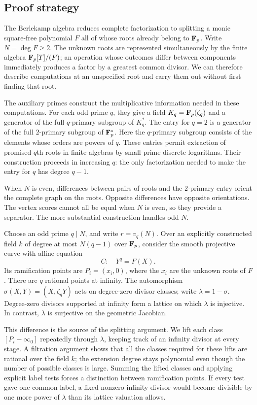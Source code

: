 \subsection{Proof strategy}

The Berlekamp algebra reduces complete factorization to splitting a monic
square-free polynomial $F$ all of whose roots already belong to $\mathbf F_p$.
Write $N=\deg F\ge2$. The unknown roots are represented simultaneously
by the finite algebra $\mathbf F_p[T]/(F)$; an operation whose outcomes differ
between components immediately produces a factor by a greatest common
divisor. We can therefore describe computations at an unspecified root
and carry them out without first finding that root.

The auxiliary primes construct the multiplicative information needed in
these computations. For each odd prime $q$, they give a field
$K_q=\mathbf F_p(\zeta_q)$ and a generator of the full $q$-primary subgroup of
$K_q^*$. The entry for $q=2$ is a generator of the full $2$-primary
subgroup of $\mathbf F_p^*$. Here the $q$-primary subgroup consists of the
elements whose orders are powers of $q$. These entries permit extraction
of promised $q$th roots in finite algebras by small-prime discrete
logarithms. Their construction proceeds in increasing $q$: the only
factorization needed to make the entry for $q$ has degree $q-1$.

When $N$ is even, differences between pairs of roots and the $2$-primary
entry orient the complete graph on the roots. Opposite differences have
opposite orientations. The vertex scores cannot all be equal when $N$
is even, so they provide a separator. The more substantial construction
handles odd $N$.

Choose an odd prime $q\mid N$, and write $r=v_q(N)$. Over an explicitly
constructed field $k$ of degree at most $N(q-1)$ over $\mathbf F_p$, consider
the smooth projective curve with affine equation
\[
 C:\quad Y^q=F(X).
\]
Its ramification points are $P_i=(x_i,0)$, where the $x_i$ are the
unknown roots of $F$. There are $q$ rational points at infinity.
The automorphism $\sigma(X,Y)=(X,\zeta_qY)$ acts on degree-zero divisor
classes; write $\lambda=1-\sigma$. Degree-zero divisors supported at
infinity form a lattice on which $\lambda$ is injective. In contrast,
$\lambda$ is surjective on the geometric Jacobian.

This difference is the source of the splitting argument. We lift each
class $[P_i-\infty_0]$ repeatedly through $\lambda$, keeping track of
an infinity divisor at every stage. A filtration argument shows that all
the classes required for these lifts are rational over the field $k$;
the extension degree stays polynomial even though the number of possible
classes is large. Summing the lifted classes and applying explicit label
tests forces a distinction between ramification points. If every test
gave one common label, a fixed nonzero infinity divisor would become
divisible by one more power of $\lambda$ than its lattice valuation
allows.

